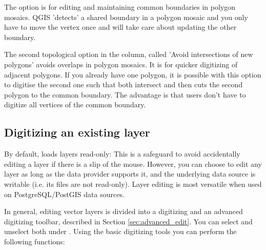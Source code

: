 
The option  is for editing and maintaining
common boundaries in polygon mosaics. QGIS 'detects' a shared boundary in
a polygon mosaic and you only have to move the vertex once and \qg will take
care about updating the other boundary.


The second topological option in the  column, called 
'Avoid intersections of new polygons' avoids overlaps in polygon mosaics. It is 
for quicker digitizing of adjacent polygons. If you already have one polygon, 
it is possible with this option to digitise the second one such that both 
intersect and \qg then cuts the second polygon to the common boundary. The 
advantage is that users don't have to digitize all vertices of the common 
boundary.

\subsection{Digitizing an existing layer}
\label{sec:edit_existing_layer}

By default, \qg loads layers read-only: This is a safeguard
to avoid accidentally editing a layer if there is a slip of the mouse.
However, you can choose to edit any layer as long as the data provider
supports it, and the underlying data source is writable (i.e. its files are
not read-only). Layer editing is most versatile when used on
PostgreSQL/PostGIS data sources.

In general, editing vector layers is divided into a digitizing and an advanced
digitizing toolbar, described in Section \ref{sec:advanced_edit}. You can
select and unselect both under  \arrow {}.
Using the basic digitizing tools you can perform the following functions:

